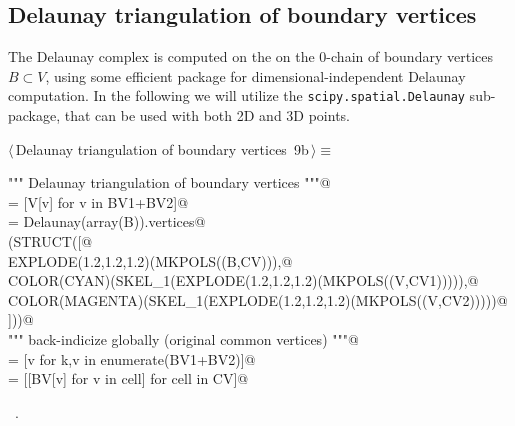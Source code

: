\documentclass[11pt,oneside]{article}	%
\begin{document}
\subsection{Delaunay triangulation of boundary vertices}

The Delaunay complex is computed on the on the 0-chain of boundary vertices $B\subset V$, using some efficient package for dimensional-independent Delaunay computation. In the following  we will utilize the \texttt{scipy.spatial.Delaunay} sub-package, that can be used with both 2D and 3D points. 

\begin{flushleft} \small \label{scrap13}
\protect{}$\langle\,$Delaunay triangulation of boundary vertices\nobreak\ {\footnotesize 9b}$\,\rangle\equiv$
\vspace{-1ex}
\begin{list}{}{} \item
\mbox{}\verb@""" Delaunay triangulation of boundary vertices """@\\
\mbox{}\verb@B = [V[v] for v in BV1+BV2]@\\
\mbox{}\verb@CV = Delaunay(array(B)).vertices@\\
\mbox{}\verb@VIEW(STRUCT([@\\
\mbox{}\verb@   EXPLODE(1.2,1.2,1.2)(MKPOLS((B,CV))),@\\
\mbox{}\verb@   COLOR(CYAN)(SKEL_1(EXPLODE(1.2,1.2,1.2)(MKPOLS((V,CV1))))),@\\
\mbox{}\verb@   COLOR(MAGENTA)(SKEL_1(EXPLODE(1.2,1.2,1.2)(MKPOLS((V,CV2)))))@\\
\mbox{}\verb@]))@\\
\mbox{}\verb@""" back-indicize globally (original common vertices) """@\\
\mbox{}\verb@BV = [v for k,v in enumerate(BV1+BV2)]@\\
\mbox{}\verb@CV = [[BV[v] for v in cell] for cell in CV]@\\
\mbox{}\verb@@{\NWsep}
\end{list}
\vspace{-1ex}
\footnotesize\addtolength{\baselineskip}{-1ex}
\begin{list}{}{\setlength{\itemsep}{-\parsep}\setlength{\itemindent}{-\leftmargin}}
\item \NWtxtMacroRefIn\ .
\end{list}
\end{flushleft}
\end{document}
